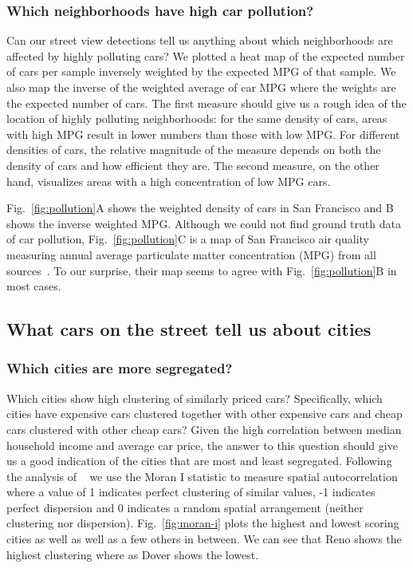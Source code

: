 \documentclass[10pt,twocolumn,letterpaper]{article}
\begin{document}
\subsubsection{Which neighborhoods have high car pollution?}
Can our street view detections tell us anything about which neighborhoods are affected by highly polluting cars? We plotted a heat map of the expected number of cars per sample inversely weighted by the expected MPG of that sample. We also map the inverse of the weighted average of car MPG where the weights are the expected number of cars. The first measure should give us a rough idea of the location of highly polluting neighborhoods: for the same density of cars, areas with high MPG result in lower numbers than those with low MPG. For different densities of cars, the relative magnitude of the measure depends on both the density of cars and how efficient they are. The second measure, on the other hand, visualizes areas with a high concentration of low MPG cars.

Fig.~\ref{fig:pollution}A shows the weighted density of cars in San Francisco and B shows the inverse weighted MPG. Although we could not find ground truth data of car pollution, Fig.~\ref{fig:pollution}C is a map of San Francisco air quality measuring annual average particulate matter concentration (MPG) from all sources~\cite{air_quality_gov}. To our surprise, their map seems to agree with Fig.~\ref{fig:pollution}B in most cases.

\subsection{What cars on the street tell us about cities}
\subsubsection{Which cities are more segregated?}
Which cities show high clustering of similarly priced cars? Specifically, which cities have expensive cars clustered together with other expensive cars and cheap cars clustered with other cheap cars? Given the high correlation between median household income and average car price, the answer to this question should give us a good indication of the cities that are most and least segregated. Following the analysis of ~\cite{mit_plos_1} we use the Moran I statistic to measure spatial autocorrelation where a value of 1 indicates perfect clustering of similar values, -1 indicates perfect dispersion and 0 indicates a random spatial arrangement (neither clustering nor dispersion). Fig.~\ref{fig:moran-i} plots the highest and lowest scoring cities as well as well as a few others in between. We can see that Reno shows the highest clustering where as Dover shows the lowest.
\end{document}
